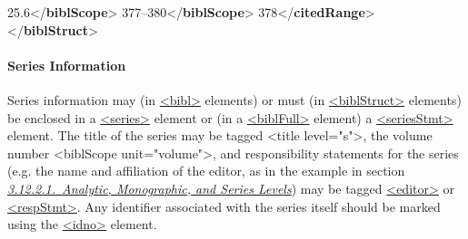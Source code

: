 \begin{shaded}
\hspace*{1em}\mbox{}\newline 
\hspace*{1em}25.6{</\textbf{biblScope}>}\mbox{}\newline 
\hspace*{1em}377–380{</\textbf{biblScope}>}\mbox{}\newline 
{}\mbox{}\newline 
{}378{</\textbf{citedRange}>}\mbox{}\newline 
{</\textbf{biblStruct}>}\end{shaded}\egroup\par 
\paragraph[{Series Information}]{Series Information}\label{COBICOS}\par
Series information may (in \hyperref[TEI.bibl]{<bibl>} elements) or must (in \hyperref[TEI.biblStruct]{<biblStruct>} elements) be enclosed in a \hyperref[TEI.series]{<series>} element or (in a \hyperref[TEI.biblFull]{<biblFull>} element) a \hyperref[TEI.seriesStmt]{<seriesStmt>} element. The title of the series may be tagged <title level="s">, the volume number <biblScope unit="volume">, and responsibility statements for the series (e.g. the name and affiliation of the editor, as in the example in section \textit{\hyperref[COBICOL]{3.12.2.1.\ Analytic, Monographic, and Series Levels}}) may be tagged \hyperref[TEI.editor]{<editor>} or \hyperref[TEI.respStmt]{<respStmt>}. Any identifier associated with the series itself should be marked using the \hyperref[TEI.idno]{<idno>} element.
